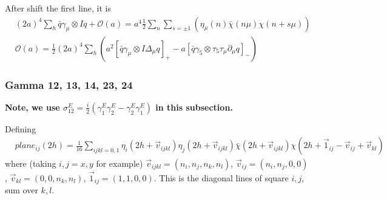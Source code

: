 After shift the first line, it is
\textcolor[rgb]{0,0,1}{
\begin{equation}
\begin{split}
&(2a)^4\sum _h \bar{q}\gamma _{\mu}\otimes I q + \mathcal{O}(a) = a^4 \frac{1}{2}\sum _n\sum _{s=\pm 1}\left(\eta _{\mu}(n)\bar{\chi}(n\mu)\chi(n+s\mu)\right)\\
&\mathcal{O}(a) =\frac{1}{2}(2a)^4\sum _h  \left(a^2 \left[ \bar{q}\gamma _{\mu}\otimes I \Delta _{\mu} q\right]_+ - a \left[\bar{q}\gamma _5\otimes \tau_5\tau_{\mu} \partial _{\mu} q\right]_-\right)
\end{split}
\end{equation} 
}

\subsubsection{\label{sec:gamma1213142334ks}Gamma 12, 13, 14, 23, 24}

\textbf{\textcolor[rgb]{1,0,0}{Note, we use $\sigma _{12}^E=\frac{i}{2}\left(\gamma _1^E\gamma _2^E-\gamma _2^E\gamma _1^E\right)$ in this subsection.}}

Defining
\begin{equation}
\begin{split}
&plane_{ij}(2h)=\frac{1}{16}\sum _{ijkl=0, 1} \eta _i(2h+\vec{v}_{ijkl})\eta _j(2h+\vec{v}_{ijkl})\bar{\chi}(2h+\vec{v}_{ijkl})\chi(2h+\vec{1}_{ij}-\vec{v}_{ij} + \vec{v}_{kl})
\end{split}
\end{equation}
where (taking $i,j=x,y$ for example) $\vec{v}_{ijkl}=(n_i,n_j,n_k,n_l)$, $\vec{v}_{ij}=(n_i,n_j,0,0)$, $\vec{v}_{kl}=(0,0,n_k,n_l)$, $\vec{1}_{ij}=(1,1,0,0)$. This is the diagonal lines of square $i,j$, sum over $k,l$.

